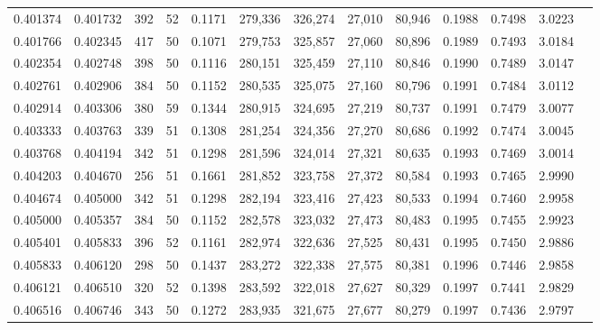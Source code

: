 \begin{tabular}{rrrrrrrrrrrrr}
0.401374 & 0.401732 &    392 &    52 &                                     0.1171 & 279,336 & 326,274 &  27,010 &  80,946 & 0.1988 & 0.7498 & 3.0223 \\
0.401766 & 0.402345 &    417 &    50 &                                     0.1071 & 279,753 & 325,857 &  27,060 &  80,896 & 0.1989 & 0.7493 & 3.0184 \\
0.402354 & 0.402748 &    398 &    50 &                                     0.1116 & 280,151 & 325,459 &  27,110 &  80,846 & 0.1990 & 0.7489 & 3.0147 \\
0.402761 & 0.402906 &    384 &    50 &                                     0.1152 & 280,535 & 325,075 &  27,160 &  80,796 & 0.1991 & 0.7484 & 3.0112 \\
0.402914 & 0.403306 &    380 &    59 &                                     0.1344 & 280,915 & 324,695 &  27,219 &  80,737 & 0.1991 & 0.7479 & 3.0077 \\
0.403333 & 0.403763 &    339 &    51 &                                     0.1308 & 281,254 & 324,356 &  27,270 &  80,686 & 0.1992 & 0.7474 & 3.0045 \\
0.403768 & 0.404194 &    342 &    51 &                                     0.1298 & 281,596 & 324,014 &  27,321 &  80,635 & 0.1993 & 0.7469 & 3.0014 \\
0.404203 & 0.404670 &    256 &    51 &                                     0.1661 & 281,852 & 323,758 &  27,372 &  80,584 & 0.1993 & 0.7465 & 2.9990 \\
0.404674 & 0.405000 &    342 &    51 &                                     0.1298 & 282,194 & 323,416 &  27,423 &  80,533 & 0.1994 & 0.7460 & 2.9958 \\
0.405000 & 0.405357 &    384 &    50 &                                     0.1152 & 282,578 & 323,032 &  27,473 &  80,483 & 0.1995 & 0.7455 & 2.9923 \\
0.405401 & 0.405833 &    396 &    52 &                                     0.1161 & 282,974 & 322,636 &  27,525 &  80,431 & 0.1995 & 0.7450 & 2.9886 \\
0.405833 & 0.406120 &    298 &    50 &                                     0.1437 & 283,272 & 322,338 &  27,575 &  80,381 & 0.1996 & 0.7446 & 2.9858 \\
0.406121 & 0.406510 &    320 &    52 &                                     0.1398 & 283,592 & 322,018 &  27,627 &  80,329 & 0.1997 & 0.7441 & 2.9829 \\
0.406516 & 0.406746 &    343 &    50 &                                     0.1272 & 283,935 & 321,675 &  27,677 &  80,279 & 0.1997 & 0.7436 & 2.9797 \\

\end{tabular}
